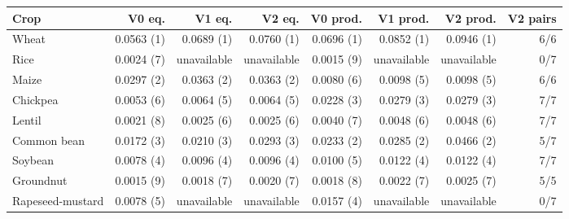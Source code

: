 \begin{tabular}{@{}lrrrrrrr@{}}
\toprule
Crop & V0 eq. & V1 eq. & V2 eq. & V0 prod. & V1 prod. & V2 prod. & V2 pairs \\
\midrule
Wheat & 0.0563 (1) & 0.0689 (1) & 0.0760 (1) & 0.0696 (1) & 0.0852 (1) & 0.0946 (1) & 6/6 \\
Rice & 0.0024 (7) & unavailable & unavailable & 0.0015 (9) & unavailable & unavailable & 0/7 \\
Maize & 0.0297 (2) & 0.0363 (2) & 0.0363 (2) & 0.0080 (6) & 0.0098 (5) & 0.0098 (5) & 6/6 \\
Chickpea & 0.0053 (6) & 0.0064 (5) & 0.0064 (5) & 0.0228 (3) & 0.0279 (3) & 0.0279 (3) & 7/7 \\
Lentil & 0.0021 (8) & 0.0025 (6) & 0.0025 (6) & 0.0040 (7) & 0.0048 (6) & 0.0048 (6) & 7/7 \\
Common bean & 0.0172 (3) & 0.0210 (3) & 0.0293 (3) & 0.0233 (2) & 0.0285 (2) & 0.0466 (2) & 5/7 \\
Soybean & 0.0078 (4) & 0.0096 (4) & 0.0096 (4) & 0.0100 (5) & 0.0122 (4) & 0.0122 (4) & 7/7 \\
Groundnut & 0.0015 (9) & 0.0018 (7) & 0.0020 (7) & 0.0018 (8) & 0.0022 (7) & 0.0025 (7) & 5/5 \\
Rapeseed-mustard & 0.0078 (5) & unavailable & unavailable & 0.0157 (4) & unavailable & unavailable & 0/7 \\
\bottomrule
\end{tabular}
